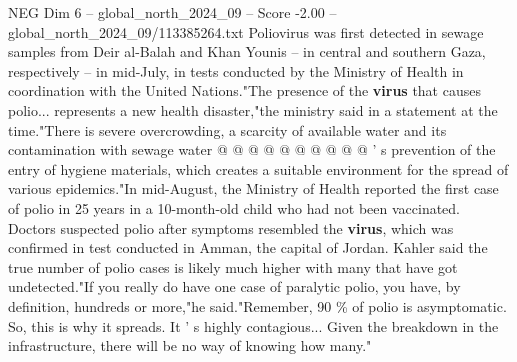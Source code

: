 \begin{textsample}{NEG Dim 6 – global\_north\_2024\_09 – Score -2.00 – global\_north\_2024\_09/113385264.txt}
Poliovirus was first detected in sewage samples from Deir al-Balah and Khan Younis -- in central and southern Gaza, respectively -- in mid-July, in tests conducted by the Ministry of Health in coordination with the United Nations."The presence of the \textbf{virus} that causes polio... represents a new health disaster,"the ministry said in a statement at the time."There is severe overcrowding, a scarcity of available water and its contamination with sewage water @ @ @ @ @ @ @ @ @ @ ' s prevention of the entry of hygiene materials, which creates a suitable environment for the spread of various epidemics."In mid-August, the Ministry of Health reported the first case of polio in 25 years in a 10-month-old child who had not been vaccinated.
Doctors suspected polio after symptoms resembled the \textbf{virus}, which was confirmed in test conducted in Amman, the capital of Jordan.
Kahler said the true number of polio cases is likely much higher with many that have got undetected."If you really do have one case of paralytic polio, you have, by definition, hundreds or more,"he said."Remember, 90 \% of polio is asymptomatic.
So, this is why it spreads.
It ' s highly contagious...
Given the breakdown in the infrastructure, there will be no way of knowing how many."

\end{textsample}
